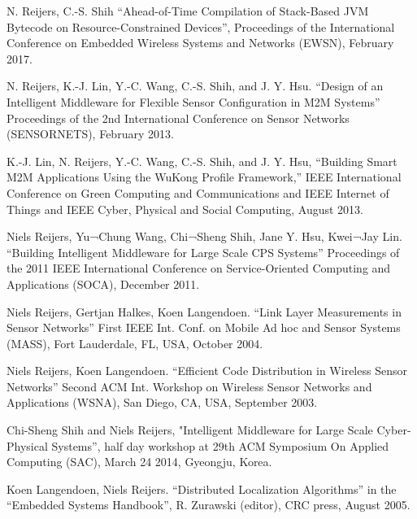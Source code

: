 \documentclass[10pt,a4paper]{../altacv}
\begin{document}
\begin{fullwidth}
\medskip\medskip

N. Reijers, C.-S. Shih “Ahead-of-Time Compilation of Stack-Based JVM Bytecode on Resource-Constrained Devices”, Proceedings of the International Conference on Embedded Wireless Systems and Networks (EWSN), February 2017.

\medskip\medskip

N. Reijers, K.-J. Lin, Y.-C. Wang, C.-S. Shih, and J. Y. Hsu. “Design of an Intelligent Middleware for Flexible Sensor Configuration in M2M Systems” Proceedings of the 2nd International Conference on Sensor Networks (SENSORNETS), February 2013.

\medskip\medskip

K.-J. Lin, N. Reijers, Y.-C. Wang, C.-S. Shih, and J. Y. Hsu, “Building Smart M2M Applications Using the WuKong Profile Framework,” IEEE International Conference on Green Computing and Communications and IEEE Internet of Things and IEEE Cyber, Physical and Social Computing, August 2013.

\medskip\medskip

Niels Reijers, Yu¬Chung Wang, Chi¬Sheng Shih, Jane Y. Hsu, Kwei¬Jay Lin. “Building Intelligent Middleware for Large Scale CPS Systems” Proceedings of the 2011 IEEE International Conference on Service-Oriented Computing and Applications (SOCA), December 2011.

\medskip\medskip

Niels Reijers, Gertjan Halkes, Koen Langendoen. “Link Layer Measurements in Sensor Networks” First IEEE Int. Conf. on Mobile Ad hoc and Sensor Systems (MASS), Fort Lauderdale, FL, USA, October 2004.

\medskip\medskip

Niels Reijers, Koen Langendoen. “Efficient Code Distribution in Wireless Sensor Networks” Second ACM Int. Workshop on Wireless Sensor Networks and Applications (WSNA), San Diego, CA, USA, September 2003.

\bigskip\bigskip


Chi-Sheng Shih and Niels Reijers, "Intelligent Middleware for Large Scale Cyber-Physical Systems”, half day workshop at 29th ACM Symposium On Applied Computing (SAC), March 24 2014, Gyeongju, Korea.

\bigskip\bigskip


Koen Langendoen, Niels Reijers. “Distributed Localization Algorithms” in the “Embedded Systems Handbook”, R. Zurawski (editor), CRC press, August 2005.  


\end{fullwidth}
\end{document}
